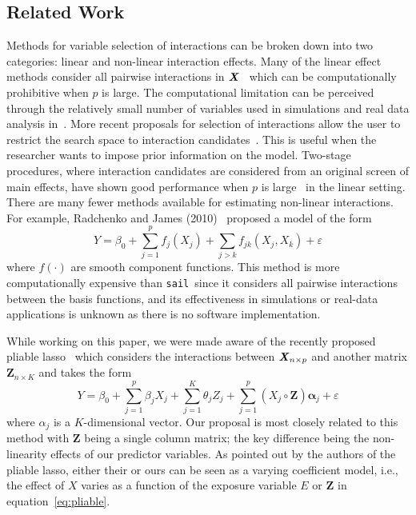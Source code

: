 \documentclass[12pt,letter]{article}\usepackage[]{graphicx}\usepackage[]{color}
\newcommand{\sail}{\texttt{sail}}
\newcommand{\bX}{\textbf{\emph{X}}}
\newcommand{\balpha}{\boldsymbol{\alpha}}
\newcommand{\mb}[1]{\mathbf{#1}}
\begin{document}
\subsection{Related Work}
Methods for variable selection of interactions can be broken down into two categories: linear and non-linear interaction effects.
Many of the linear effect methods consider all pairwise interactions in $\bX$~\citep{zhao2009composite,choi2010variable,bien2013lasso, she2014group} which can be computationally prohibitive when $p$ is large. The computational limitation can be perceived through the relatively small number of variables used in simulations and real data analysis in~\citep{zhao2009composite,choi2010variable,bien2013lasso, she2014group}.
More recent proposals for selection of interactions allow the user to restrict the search space to interaction candidates~\citep{lim2015learning,haris2016convex}. This is useful when the researcher wants to impose prior information on the model.
Two-stage procedures, where interaction candidates are considered from an original screen of main effects, have shown good performance when $p$ is large~\citep{hao2018model,shah2016modelling} in the linear setting.
There are many fewer methods available for estimating non-linear interactions. For example, Radchenko and James (2010)~\citep{radchenko2010variable} proposed a model of the form
\[Y = \beta_0 + \sum_{j=1}^{p} f_j(X_j) + \sum_{j>k}f_{jk}(X_j, X_k) + \varepsilon\]
where $f(\cdot)$ are smooth component functions. This method is more computationally expensive than \sail ~since it considers all pairwise interactions between the basis functions, and its effectiveness in simulations or real-data applications is unknown as there is no software implementation.

While working on this paper, we were made aware of the recently proposed pliable lasso~\citep{tibshirani2017pliable} which considers the interactions between $\bX_{n \times p}$ and another matrix $\mathbf{Z}_{n\times K}$ and takes the form
\begin{equation}
Y = \beta_0 + \sum_{j=1}^{p}\beta_j X_j + \sum_{j=1}^{K}\theta_j Z_j + \sum_{j=1}^{p} (X_j \circ \mathbf{Z}) \balpha_j + \varepsilon \label{eq:pliable}
\end{equation}
where $\alpha_j$ is a $K$-dimensional vector.
Our proposal is most closely related to this method with $\mathbf{Z}$ being a single column matrix; the key difference being the non-linearity effects of our predictor variables.
As pointed out by the authors of the pliable lasso, either their or ours can be seen as a varying coefficient model, i.e., the effect of $X$ varies as a function of the exposure variable $E$ or $\mb{Z}$ in equation~\ref{eq:pliable}.
\end{document}
